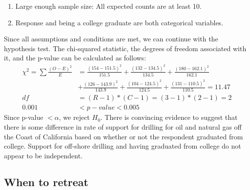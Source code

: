 {{\begin{enumerate}[1.]
\begin{itemize}
\item Random Sampling Condition: We are not that the sample is random.
\item 10\% Condition: We can safely assume that 438 $<$ 10\% of all Californians who are college graduates and 389 $<$ 10\% of all Californians who not are college graduates.
\end{itemize}
Since we have a random sample and with the 10\% condition is satisfied, we can assume that whether or not one Californian in the sample supports, opposes or doesn't have an opinion on off-shore drilling is independent of another.
\item Large enough sample size: All expected counts are at least 10.
\item Response and being a college graduate are both categorical variables.
\end{enumerate}
Since all assumptions and conditions are met, we can continue with the hypothesis test. The chi-squared statistic, the degrees of freedom associated with it, and the p-value can be calculated as follows:
\begin{align*}
\chi^2 = \sum \frac{(O - E)^2}{E} &=  \frac{(154 - 151.5)^2} {151.5} + \frac{(132 - 134.5)^2} {134.5} + \frac{(180 - 162.1)^2} {162.1} \\
&+ \frac{(126 - 143.9)^2} {143.9} + \frac{(104 - 124.5)^2} {124.5} + \frac{(131 - 110.5)^2} {110.5} = 11.47 \\
df &= (R - 1) * (C - 1) = (3 - 1) * (2 - 1) = 2 \\
0.001 &< p-value < 0.005
\end{align*}
Since p-value $< \alpha$, we reject $H_0$.  There is convincing evidence to suggest that there is some difference in rate of support for drilling for oil and natural gas off the Coast of California based on whether or not the respondent graduated from college. Support for off-shore drilling and having graduated from college do not appear to be independent.
}
}

%

\subsection{When to retreat}

